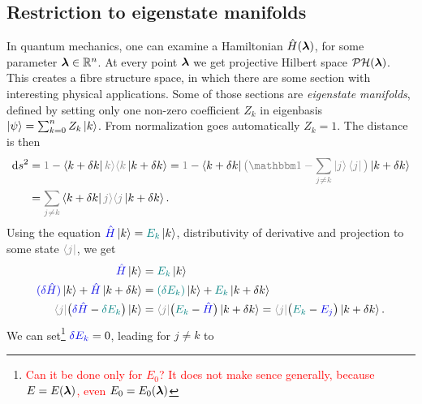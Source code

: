 \subsection{Restriction to eigenstate manifolds}
In quantum mechanics, one can examine a Hamiltonian $\hat{H}({\bm\lambda})$, for some parameter ${\bm\lambda}\in \mathbb{R}^n$. At every point ${\bm\lambda}$ we get projective Hilbert space $\mathcal{PH}({\bm\lambda})$. This creates a fibre structure space, in which there are some section with interesting physical applications. Some of those sections are \emph{eigenstate manifolds}, defined by setting only one non-zero coefficient $Z_k$ in eigenbasis $\ket{\psi}=\sum_{k=0}^n Z_k \ket{k}$. From normalization goes automatically $Z_k=1$. The distance is then
\begin{equation}
    \begin{split}
        \d s^2 &= \textcolor{gray}{1}-\bra{k+\delta k}\textcolor{gray}{k\rangle \langle k}\ket{k+\delta k}=\textcolor{gray}{1}-\bra{k+\delta k}\textcolor{gray}{\big(\Id-\sum_{j\neq k} \ket{j}\bra{j}\big)}\ket{k+\delta k} \\
        &= \textcolor{gray}{\sum_{j\neq k}}\bra{k+\delta k}\textcolor{gray}{j\rangle \langle j}\ket{k+\delta k}.
        \label{eq:dsDerivation}
    \end{split}
\end{equation}
Using the \Schrodinger equation $\textcolor{blue}{\HH}\ket{k}=\textcolor{teal}{E_k} \ket{k}$, distributivity of derivative and projection to some state $\textcolor{gray}{\bra{j}}$, we get
\begin{equation}
    \begin{split}
        \textcolor{blue}{\HH}\ket{k} &= \textcolor{teal}{E_k}\ket{k}\\
        \textcolor{blue}{(\delta \HH)}\ket{k} +\textcolor{blue}{\HH}\ket{k+\delta k} &=\textcolor{teal}{(\delta E_k)}\ket{k} +\textcolor{teal}{E_k}\ket{k+\delta k}\\
         \textcolor{gray}{\bra{j}}\big(\textcolor{blue}{\delta \HH}-\textcolor{teal}{\delta E_k}\big)\ket{k}&=\textcolor{gray}{\bra{j}}\big(\textcolor{teal}{E_k}-\textcolor{blue}{\HH}\big)\ket{k+\delta k}=\textcolor{gray}{\bra{j}}\big(\textcolor{teal}{E_k}-\textcolor{blue}{E_j}\big)\ket{k+\delta k}.
    \end{split}
\end{equation}
We can set\footnote{\textcolor{red}{Can it be done only for $E_0$? It does not make sence generally, because $E=E({\bm\lambda})$, even $E_0=E_0({\bm\lambda})$}} $\textcolor{blue}{\delta E_k}=0$, leading for $j\neq k$ to
